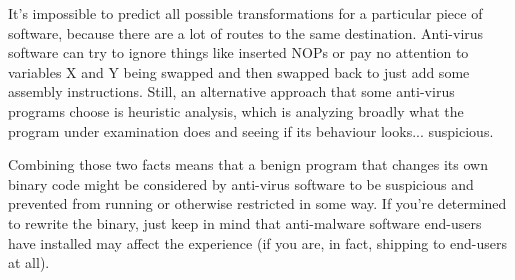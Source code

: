 It's impossible to predict all possible transformations for a particular piece of software, because there are a lot of routes to the same destination. Anti-virus software can try to ignore things like inserted NOPs or pay no attention to variables X and Y being swapped and then swapped back to just add some assembly instructions. Still, an alternative approach that some anti-virus programs choose is heuristic analysis, which is analyzing broadly what the program under examination does and seeing if its behaviour looks... suspicious.

Combining those two facts means that a benign program that changes its own binary code might be considered by anti-virus software to be suspicious and prevented from running or otherwise restricted in some way. If you're determined to rewrite the binary, just keep in mind that anti-malware software end-users have installed may affect the experience (if you are, in fact, shipping to end-users at all).



